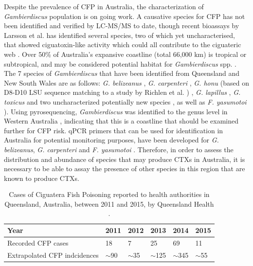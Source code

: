 \documentclass[12pt]{article}
\begin{document}
Despite the prevalence of CFP in Australia, the characterization of \textit{Gambierdiscus} population is on going work. 
A causative species for CFP has not been identified and verified by LC-MS/MS to date, though recent bioassays by Larsson et al. has identified several species, two of which yet uncharacterised, that showed ciguatoxin-like activity which could all contribute to the ciguateric web \cite{larsson2018toxicology}.
Over 50\% of Australia's expansive coastline (total 66,000 km) is tropical or subtropical, and may be considered potential habitat for \emph{Gambierdiscus} spp. \citep{kretzschmar2017characterization}. 
The 7 species of \emph{Gambierdiscus} that have been identified from Queensland and New South Wales are as follows: \emph{G. belizeanus} \citep{murray2014molecular}, \emph{G. carpenteri} \citep{kohli2014high,sparrow2017effects}, \emph{G. honu} (based on D8-D10 LSU sequence matching to a study by Richlen et al. \cite{richlen2008phylogeography}) \citep{rhodes2017new}, \emph{G. lapillus} \citep{kretzschmar2017characterization,larsson2018toxicology}, \emph{G. toxicus} \citep{hallegraeff2010algae} and two uncharacterized potentially new species \cite{larsson2018toxicology}, as well as \emph{F. yasumotoi}  \citep{murray2014molecular}). 
Using pyrosequencing, \textit{Gambierdiscus} was identified to the genus level in Western Australia \citep{kohli2014cob}, indicating that this is a coastline that should be examined further for CFP risk. 
qPCR primers that can be used for identification in Australia for potential monitoring purposes, have been developed for \emph{G. belizeanus}, \emph{G. carpenteri} and \emph{F. yasumotoi} \citep{nishimura2016quantitative,vandersea2012development}. 
Therefore, in order to assess the distribution and abundance of species that may produce CTXs in Australia, it is necessary to be able to assay the presence of other species in this region that are known to produce CTXs.\\ 
\begin{table}
\caption{Cases of Ciguatera Fish Poisoning reported to health authorities in Queensland, Australia, between 2011 and 2015, by Queensland Health \citep{qldcig}.}
\label{tbl:CFPTable}
\begin{tabular}{ | p{6cm} | p{1.5cm} | p{1.5cm}| p{1.5cm} | p{1.5cm} | p{1.5cm} | }
\hline
Year &2011&2012&2013&2014&2015\\
\hline
Recorded CFP cases&18&7&25&69&11\\
\hline
Extrapolated CFP indcidences&$\sim$90&$\sim$35&$\sim$125&$\sim$345&$\sim$55\\
\hline
\end{tabular}
\end{table}
\FloatBarrier
\end{document}
